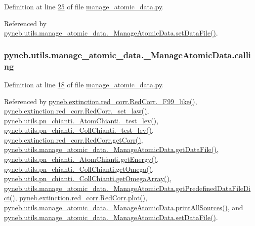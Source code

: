 Definition at line \hyperlink{manage__atomic__data_8py_source_l00025}{25} of file \hyperlink{manage__atomic__data_8py_source}{manage\-\_\-atomic\-\_\-data.\-py}.



Referenced by \hyperlink{manage__atomic__data_8py_source_l00380}{pyneb.\-utils.\-manage\-\_\-atomic\-\_\-data.\-\_\-\-Manage\-Atomic\-Data.\-set\-Data\-File()}.

\hypertarget{classpyneb_1_1utils_1_1manage__atomic__data_1_1___manage_atomic_data_ab10b91ca784741ce7af163d010802434}{
\subsubsection[{calling}]{\setlength{\rightskip}{0pt plus 5cm}pyneb.\-utils.\-manage\-\_\-atomic\-\_\-data.\-\_\-\-Manage\-Atomic\-Data.\-calling}}\label{classpyneb_1_1utils_1_1manage__atomic__data_1_1___manage_atomic_data_ab10b91ca784741ce7af163d010802434}


Definition at line \hyperlink{manage__atomic__data_8py_source_l00018}{18} of file \hyperlink{manage__atomic__data_8py_source}{manage\-\_\-atomic\-\_\-data.\-py}.



Referenced by \hyperlink{red__corr_8py_source_l00658}{pyneb.\-extinction.\-red\-\_\-corr.\-Red\-Corr.\-\_\-\-F99\-\_\-like()}, \hyperlink{red__corr_8py_source_l00176}{pyneb.\-extinction.\-red\-\_\-corr.\-Red\-Corr.\-\_\-set\-\_\-law()}, \hyperlink{pn__chianti_8py_source_l00304}{pyneb.\-utils.\-pn\-\_\-chianti.\-\_\-\-Atom\-Chianti.\-\_\-test\-\_\-lev()}, \hyperlink{pn__chianti_8py_source_l00472}{pyneb.\-utils.\-pn\-\_\-chianti.\-\_\-\-Coll\-Chianti.\-\_\-test\-\_\-lev()}, \hyperlink{red__corr_8py_source_l00211}{pyneb.\-extinction.\-red\-\_\-corr.\-Red\-Corr.\-get\-Corr()}, \hyperlink{manage__atomic__data_8py_source_l00297}{pyneb.\-utils.\-manage\-\_\-atomic\-\_\-data.\-\_\-\-Manage\-Atomic\-Data.\-get\-Data\-File()}, \hyperlink{pn__chianti_8py_source_l00366}{pyneb.\-utils.\-pn\-\_\-chianti.\-\_\-\-Atom\-Chianti.\-get\-Energy()}, \hyperlink{pn__chianti_8py_source_l00507}{pyneb.\-utils.\-pn\-\_\-chianti.\-\_\-\-Coll\-Chianti.\-get\-Omega()}, \hyperlink{pn__chianti_8py_source_l00484}{pyneb.\-utils.\-pn\-\_\-chianti.\-\_\-\-Coll\-Chianti.\-get\-Omega\-Array()}, \hyperlink{manage__atomic__data_8py_source_l00034}{pyneb.\-utils.\-manage\-\_\-atomic\-\_\-data.\-\_\-\-Manage\-Atomic\-Data.\-get\-Predefined\-Data\-File\-Dict()}, \hyperlink{red__corr_8py_source_l00303}{pyneb.\-extinction.\-red\-\_\-corr.\-Red\-Corr.\-plot()}, \hyperlink{manage__atomic__data_8py_source_l00431}{pyneb.\-utils.\-manage\-\_\-atomic\-\_\-data.\-\_\-\-Manage\-Atomic\-Data.\-print\-All\-Sources()}, and \hyperlink{manage__atomic__data_8py_source_l00380}{pyneb.\-utils.\-manage\-\_\-atomic\-\_\-data.\-\_\-\-Manage\-Atomic\-Data.\-set\-Data\-File()}.

